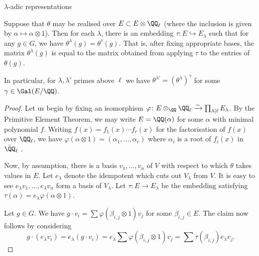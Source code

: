 \documentclass[11pt,a4paper]{article}
\begin{document}
\begin{section}{$\lambda$-adic representations}
\begin{proposition}
    
    Suppose that $\theta$ may be realised over $E  \subset E\otimes \QQ_\ell$ (where the inclusion is given by $\alpha \mapsto \alpha \otimes 1$).
    Then for each $\lambda$, there is an embedding $\tau \colon E \hookrightarrow E_\lambda$ such that for any  $g \in G$, we have $\theta^\lambda(g) = \theta^\tau(g)$.
    That is, after fixing appropriate bases, the matrix $\theta^\lambda(g)$ is equal to the matrix obtained from applying $\tau$ to the entries of $\theta(g)$.

    In particular, for $\lambda, \lambda'$ primes above $\ell$ we have $\theta^{\lambda'}=(\theta^{\lambda})^\gamma$ for some $\gamma \in \Gal(E/\QQ)$.
\end{proposition}

\begin{proof}
    Let us begin by fixing an isomorphism $\varphi \colon E\otimes_\QQ \QQ_\ell \xrightarrow{\sim} \prod_{\lambda|\ell} E_\lambda$.
    By the Primitive Element Theorem, we may write $E = \QQ(\alpha)$ for some $\alpha$ with minimal polynomial $f$.
    Writing $f(x) = f_1(x) \cdots f_r(x)$ for the factorisation of $f(x)$ over $\QQ_\ell$, we have $\varphi(\alpha \otimes 1) = (\alpha_1, \ldots , \alpha_r)$ where $\alpha_i$ is a root of $f_i(x)$ in $\Bar{\QQ}_\ell$ \cite[Pg. 163]{Neukirch_ant_book}.

    Now, by assumption, there is a basis $v_1, \ldots, v_n$ of $V$ with respect to which $\theta$ takes values in $E$.
    Let $e_\lambda$ denote the idempotent which cuts out $V_\lambda$ from $V$.
    It is easy to see $e_\lambda v_1,\ldots,e_\lambda v_n$ form a basis of $V_\lambda$.
    Let $\tau\colon E \rightarrow E_\lambda$ be the embedding satisfying $\tau (\alpha) = e_\lambda \varphi(\alpha \otimes 1) $.

    Let $g \in G$.
    We have $g\cdot v_i = \sum \varphi(\beta_{i,j} \otimes 1) v_j$ for some $\beta_{i,j} \in E$.
    The claim now follows by considering \[g \cdot (e_\lambda v_i) = e_\lambda( g \cdot  v_i) = e_\lambda \sum \varphi(\beta_{i,j} \otimes 1) v_j = \sum \tau(\beta_{i,j}) e_\lambda v_j.\]
\end{proof}

\end{section}
\end{document}
